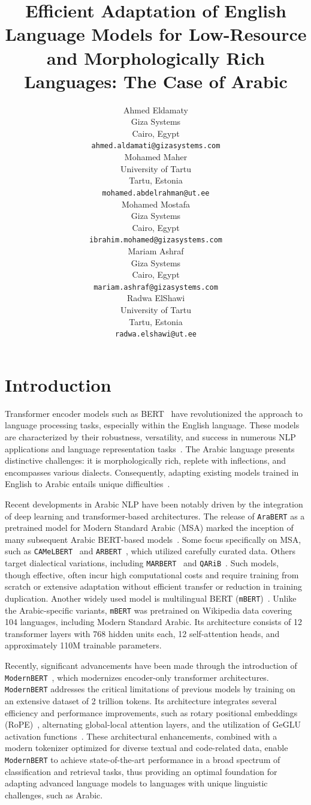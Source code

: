 \documentclass[10pt, a4paper]{article}
\title{Efficient Adaptation of English Language Models for Low-Resource and Morphologically Rich Languages: The Case of Arabic}
\author{Ahmed Eldamaty \\
Giza Systems \\
Cairo, Egypt \\
\texttt{ahmed.aldamati@gizasystems.com} \\
\And Mohamed Maher \\
University of Tartu \\
Tartu, Estonia \\
\texttt{mohamed.abdelrahman@ut.ee} \\
\And Mohamed Mostafa \\
Giza Systems \\
Cairo, Egypt \\
\texttt{ibrahim.mohamed@gizasystems.com} \\
\And Mariam Ashraf \\
Giza Systems \\
Cairo, Egypt \\
\texttt{mariam.ashraf@gizasystems.com} \\
\And Radwa ElShawi \\
University of Tartu \\
Tartu, Estonia \\
\texttt{radwa.elshawi@ut.ee} \\}
\begin{document}

\maketitleabstract
\section{Introduction}
Transformer encoder models such as BERT~\cite{devlin-etal-2019-bert} have revolutionized the approach to language processing tasks, especially within the English language. These models are characterized by their robustness, versatility, and success in numerous NLP applications and language representation tasks~\cite{Gardazi2025}. The Arabic language presents distinctive challenges: it is morphologically rich, replete with inflections, and encompasses various dialects. Consequently, adapting existing models trained in English to Arabic entails unique difficulties~\cite{MATRANE2023101570}.


Recent developments in Arabic NLP have been notably driven by the integration of deep learning and transformer-based architectures. The release of \texttt{AraBERT} as a pretrained model for Modern Standard Arabic (MSA) marked the inception of many subsequent Arabic BERT-based models~\cite{antoun2020arabert}. Some focus specifically on MSA, such as \texttt{CAMeLBERT}~\cite{inoue-etal-2021-interplay} and \texttt{ARBERT}~\cite{abdul-mageed-etal-2021-arbert}, which utilized carefully curated data. Others target dialectical variations, including \texttt{MARBERT}~\cite{abdul-mageed-etal-2021-arbert} and \texttt{QARiB}~\cite{abdelali2021pretraining}. Such models, though effective, often incur high computational costs and require training from scratch or extensive adaptation without efficient transfer or reduction in training duplication. Another widely used model is multilingual BERT (\texttt{mBERT})~\cite{devlin2018bert,alammary2022bert}. Unlike the Arabic-specific variants, \texttt{mBERT} was pretrained on Wikipedia data covering 104 languages, including Modern Standard Arabic. Its architecture consists of 12 transformer layers with 768 hidden units each, 12 self-attention heads, and approximately 110M trainable parameters.

Recently, significant advancements have been made through the introduction of \texttt{ModernBERT}~\cite{warner2024modernbert}, which modernizes encoder-only transformer architectures. \texttt{ModernBERT} addresses the critical limitations of previous models by training on an extensive dataset of 2 trillion tokens. Its architecture integrates several efficiency and performance improvements, such as rotary positional embeddings (RoPE)~\cite{su2024roformer}, alternating global-local attention layers, and the utilization of GeGLU activation functions~\cite{shazeer2020glu}. These architectural enhancements, combined with a modern tokenizer optimized for diverse textual and code-related data, enable \texttt{ModernBERT} to achieve state-of-the-art performance in a broad spectrum of classification and retrieval tasks, thus providing an optimal foundation for adapting advanced language models to languages with unique linguistic challenges, such as Arabic.
\end{document}
